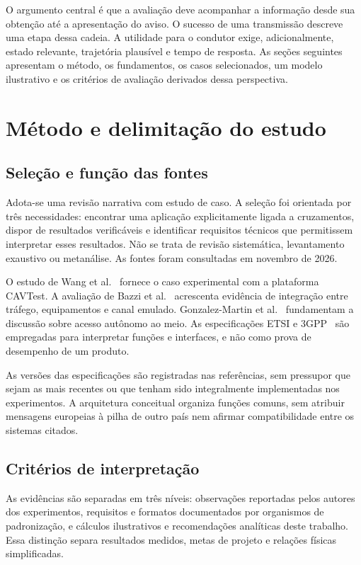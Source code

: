\documentclass[conference,a4paper]{IEEEtran}
\begin{document}
O argumento central é que a avaliação deve acompanhar a informação desde sua obtenção até a apresentação do aviso. O sucesso de uma transmissão descreve uma etapa dessa cadeia. A utilidade para o condutor exige, adicionalmente, estado relevante, trajetória plausível e tempo de resposta. As seções seguintes apresentam o método, os fundamentos, os casos selecionados, um modelo ilustrativo e os critérios de avaliação derivados dessa perspectiva.

\section{Método e delimitação do estudo}
\subsection{Seleção e função das fontes}
Adota-se uma revisão narrativa com estudo de caso. A seleção foi orientada por três necessidades: encontrar uma aplicação explicitamente ligada a cruzamentos, dispor de resultados verificáveis e identificar requisitos técnicos que permitissem interpretar esses resultados. Não se trata de revisão sistemática, levantamento exaustivo ou metanálise. As fontes foram consultadas em novembro de 2026.

O estudo de Wang et al.~\cite{wang2021} fornece o caso experimental com a plataforma CAVTest. A avaliação de Bazzi et al.~\cite{bazzi2020} acrescenta evidência de integração entre tráfego, equipamentos e canal emulado. Gonzalez-Martin et al.~\cite{gonzalez2019} fundamentam a discussão sobre acesso autônomo ao meio. As especificações ETSI e 3GPP~\cite{etsiICRW2018,etsiCAM2019,etsiSecurity2017,3gpp2024} são empregadas para interpretar funções e interfaces, e não como prova de desempenho de um produto.

As versões das especificações são registradas nas referências, sem pressupor que sejam as mais recentes ou que tenham sido integralmente implementadas nos experimentos. A arquitetura conceitual organiza funções comuns, sem atribuir mensagens europeias à pilha de outro país nem afirmar compatibilidade entre os sistemas citados.

\subsection{Critérios de interpretação}
As evidências são separadas em três níveis: observações reportadas pelos autores dos experimentos, requisitos e formatos documentados por organismos de padronização, e cálculos ilustrativos e recomendações analíticas deste trabalho. Essa distinção separa resultados medidos, metas de projeto e relações físicas simplificadas.
\end{document}
